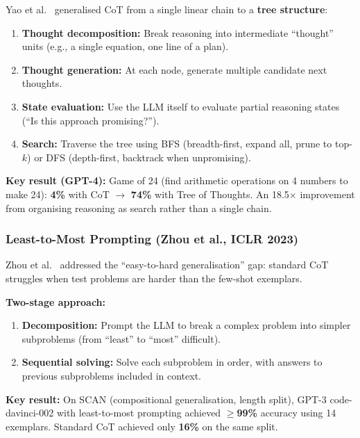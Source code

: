 \documentclass[11pt, a4paper]{article}
\theoremstyle{definition}
\theoremstyle{plain}
\begin{document}
Yao et al.~\cite{yao2023tree} generalised CoT from a single linear chain to a \textbf{tree structure}:

\begin{enumerate}
  \item \textbf{Thought decomposition:} Break reasoning into intermediate ``thought'' units (e.g., a single equation, one line of a plan).
  \item \textbf{Thought generation:} At each node, generate multiple candidate next thoughts.
  \item \textbf{State evaluation:} Use the LLM itself to evaluate partial reasoning states (``Is this approach promising?'').
  \item \textbf{Search:} Traverse the tree using BFS (breadth-first, expand all, prune to top-$k$) or DFS (depth-first, backtrack when unpromising).
\end{enumerate}

\textbf{Key result (GPT-4):} Game of 24 (find arithmetic operations on 4 numbers to make 24): \textbf{4\%} with CoT $\to$ \textbf{74\%} with Tree of Thoughts. An 18.5$\times$ improvement from organising reasoning as search rather than a single chain.

\subsubsection{Least-to-Most Prompting (Zhou et al., ICLR 2023)}

Zhou et al.~\cite{zhou2023leasttomost} addressed the ``easy-to-hard generalisation'' gap: standard CoT struggles when test problems are harder than the few-shot exemplars.

\textbf{Two-stage approach:}
\begin{enumerate}
  \item \textbf{Decomposition:} Prompt the LLM to break a complex problem into simpler subproblems (from ``least'' to ``most'' difficult).
  \item \textbf{Sequential solving:} Solve each subproblem in order, with answers to previous subproblems included in context.
\end{enumerate}

\textbf{Key result:} On SCAN (compositional generalisation, length split), GPT-3 code-davinci-002 with least-to-most prompting achieved \textbf{$\geq$99\%} accuracy using 14 exemplars. Standard CoT achieved only \textbf{16\%} on the same split.

\end{document}

